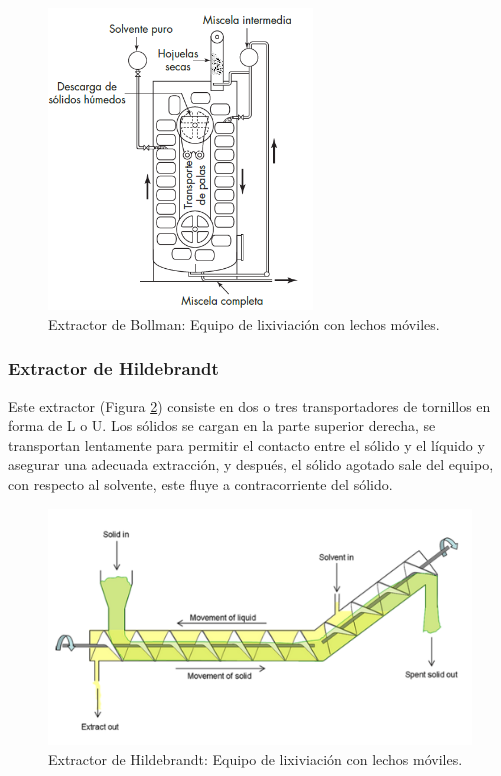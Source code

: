 \documentclass[11pt]{book}
\begin{document}
\begin{figure}[H]
    \centering
    \includegraphics[width = 7cm]{img/lixiviacion/EquipoLixiviacion_1.PNG}
    \caption{Extractor de Bollman: Equipo de lixiviación con lechos móviles.}
    \label{fig:Lixiviacion_11}
\end{figure}


\subsubsection{Extractor de Hildebrandt}

Este extractor (Figura \ref{fig:Lixiviacion_12}) consiste en dos o tres transportadores de tornillos en forma de L o U. Los sólidos se cargan en la parte superior derecha, se transportan lentamente para permitir el contacto entre el sólido y el líquido y asegurar una adecuada extracción, y después, el sólido agotado sale del equipo, con respecto al solvente, este fluye a contracorriente del sólido.

\begin{figure}[H]
    \centering
    \includegraphics{img/lixiviacion/EquipoLixiviacion_3.PNG}
    \caption{Extractor de Hildebrandt: Equipo de lixiviación con lechos móviles.}
    \label{fig:Lixiviacion_12}
\end{figure}
\end{document}
